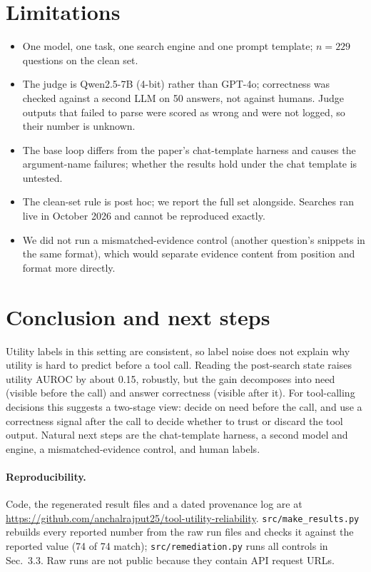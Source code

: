 \documentclass[10pt,twocolumn,a4paper]{article}
\begin{document}
\section{Limitations}
\begin{itemize}
\item One model, one task, one search engine and one prompt template; $n = 229$ questions on the clean set.
\item The judge is Qwen2.5-7B (4-bit) rather than GPT-4o; correctness was checked against a second LLM on 50 answers, not against humans. Judge outputs that failed to parse were scored as wrong and were not logged, so their number is unknown.
\item The base loop differs from the paper's chat-template harness and causes the argument-name failures; whether the results hold under the chat template is untested.
\item The clean-set rule is post hoc; we report the full set alongside. Searches ran live in October 2026 and cannot be reproduced exactly.
\item We did not run a mismatched-evidence control (another question's snippets in the same format), which would separate evidence content from position and format more directly.
\end{itemize}

\section{Conclusion and next steps}
Utility labels in this setting are consistent, so label noise does not explain why utility is hard to predict before a tool call. Reading the post-search state raises utility AUROC by about 0.15, robustly, but the gain decomposes into need (visible before the call) and answer correctness (visible after it). For tool-calling decisions this suggests a two-stage view: decide on need before the call, and use a correctness signal after the call to decide whether to trust or discard the tool output. Natural next steps are the chat-template harness, a second model and engine, a mismatched-evidence control, and human labels.

\paragraph{Reproducibility.}\raggedright Code, the regenerated result files and a dated provenance log are at \url{https://github.com/anchalrajput25/tool-utility-reliability}. \texttt{src/make\_results.py} rebuilds every reported number from the raw run files and checks it against the reported value (74 of 74 match); \texttt{src/remediation.py} runs all controls in Sec.~3.3. Raw runs are not public because they contain API request URLs.
\end{document}
